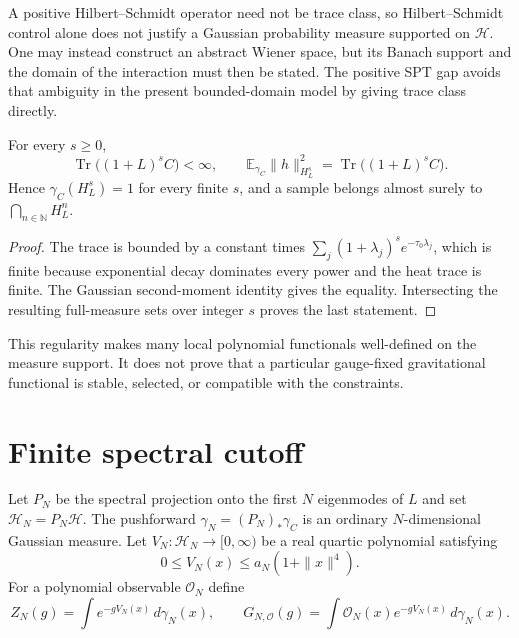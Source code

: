 \documentclass[11pt]{article}
\newcommand{\Tr}{\operatorname{Tr}}
\newcommand{\bbE}{\mathbb{E}}
\newcommand{\cH}{\mathcal{H}}
\begin{document}
\begin{remark}
A positive Hilbert--Schmidt operator need not be trace class, so Hilbert--Schmidt
control alone does not justify a Gaussian probability measure supported on $\cH$.
One may instead construct an abstract Wiener space, but its Banach support and the
domain of the interaction must then be stated. The positive SPT gap avoids that
ambiguity in the present bounded-domain model by giving trace class directly.
\end{remark}

\begin{theorem}\label{thm:sobolev}
For every $s\geq0$,
\[
 \Tr\bigl((1+L)^sC\bigr)<\infty,\qquad
 \bbE_{\gamma_C}\|h\|_{H_L^s}^2
 =\Tr\bigl((1+L)^sC\bigr).
\]
Hence $\gamma_C(H_L^s)=1$ for every finite $s$, and a sample belongs almost surely
to $\bigcap_{n\in\mathbb N}H_L^n$.
\end{theorem}

\begin{proof}
The trace is bounded by a constant times
$\sum_j(1+\lambda_j)^se^{-\tau_0\lambda_j}$, which is finite because exponential
decay dominates every power and the heat trace is finite. The Gaussian second-moment
identity gives the equality. Intersecting the resulting full-measure sets over
integer $s$ proves the last statement.
\end{proof}

This regularity makes many local polynomial functionals well-defined on the measure
support. It does not prove that a particular gauge-fixed gravitational functional is
stable, selected, or compatible with the constraints.

\section{Finite spectral cutoff}

Let $P_N$ be the spectral projection onto the first $N$ eigenmodes of $L$ and set
$\cH_N=P_N\cH$. The pushforward $\gamma_N=(P_N)_*\gamma_C$ is an ordinary
$N$-dimensional Gaussian measure. Let $V_N:\cH_N\to[0,\infty)$ be a real quartic
polynomial satisfying
\begin{equation}\label{eq:quartic-growth}
 0\leq V_N(x)\leq a_N(1+\|x\|^4).
\end{equation}
For a polynomial observable $\mathcal O_N$ define
\[
 Z_N(g)=\int e^{-gV_N(x)}\,d\gamma_N(x),\qquad
 G_{N,\mathcal O}(g)=\int \mathcal O_N(x)e^{-gV_N(x)}\,d\gamma_N(x).
\]
\end{document}

